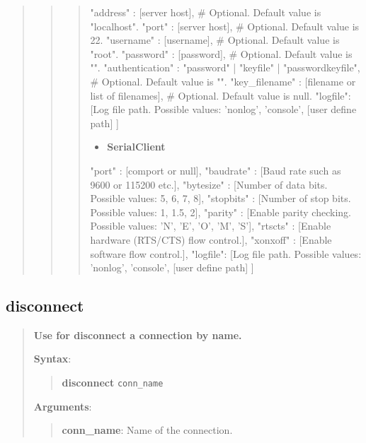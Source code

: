 \begin{quote}
\begin{quote}
\begin{quote}
\begin{robotcode}
{
    "address" : [server host],  # Optional. Default value is "localhost".
    "port" : [server host],     # Optional. Default value is 22.
    "username" : [username],    # Optional. Default value is "root".
    "password" : [password],    # Optional. Default value is "".
    "authentication" : "password" | "keyfile" | "passwordkeyfile",  # Optional. Default value is "".
    "key_filename" : [filename or list of filenames], # Optional. Default value is null.
    "logfile": [Log file path. Possible values: 'nonlog', 'console', [user define path] ]
 }
\end{robotcode}


\begin{itemize}
\tightlist
\item
  \textbf{SerialClient}
\end{itemize}


\begin{robotcode}
{
    "port" : [comport or null],
    "baudrate" : [Baud rate such as 9600 or 115200 etc.],
    "bytesize" : [Number of data bits. Possible values: 5, 6, 7, 8],
    "stopbits" : [Number of stop bits. Possible values: 1, 1.5, 2],
    "parity" : [Enable parity checking. Possible values: 'N', 'E', 'O', 'M', 'S'],
    "rtscts" : [Enable hardware (RTS/CTS) flow control.],
    "xonxoff" : [Enable software flow control.],
    "logfile": [Log file path. Possible values: 'nonlog', 'console', [user define path] ]
 }
\end{robotcode}


\end{quote}
\end{quote}
\end{quote}
\hypertarget{description-disconnect}{%
\subsection{\texorpdfstring{\textbf{disconnect}}{disconnect}}\label{description-disconnect}}

\begin{quote}
\textbf{Use for disconnect a connection by name.}

\textbf{Syntax}:

\begin{quote}
\textbf{disconnect} \texttt{conn\_name}
\end{quote}

\textbf{Arguments}:

\begin{quote}
\textbf{conn\_name}: Name of the connection.
\end{quote}
\end{quote}

